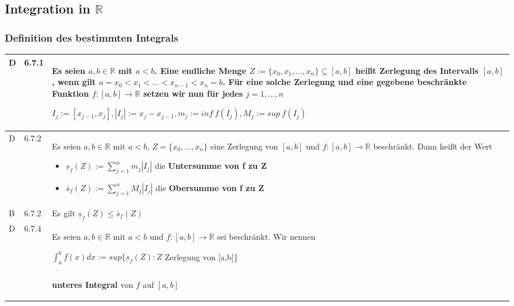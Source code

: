 \pagebreak

\subsection{Integration in $\mathbb{R}$}
\subsubsection{Definition des bestimmten Integrals}

    \begin{longtable}{p{0.75cm} p{1cm} p{16cm}}
        \toprule

        D   & 6.7.1 &   Es seien $a,b \in \mathbb{R}$ mit $a < b$. Eine endliche Menge $Z:= \{ x_0, x_1, \dots, x_n \} \subseteq [a,b]$ heißt
                        \textbf{Zerlegung} des Intervalls $[a,b]$, wenn gilt $a = x_0 < x_1 < \dots < x_{n-1} < x_n = b$. \hfill \break
                        Für eine solche Zerlegung und eine gegebene beschränkte Funktion $f: [a,b] \rightarrow \mathbb{R}$ setzen wir nun
                        für jedes $j = 1,\dots,n$ \hfill \break
                        \centerline{$ I_j := [x_{j-1},x_j], |I_j| := x_j - x_{j-1}, m_j := inf~f(I_j), M_j := sup~f(I_j)$} \\
        \midrule
        D   & 6.7.2 &   Es seien $a,b \in \mathbb{R}$ mit $a < b$, $Z = \{ x_0, \dots, x_n\}$ eine Zerlegung von $[a,b]$ und $f:[a,b]\rightarrow \mathbb{R}$
                        beschränkt. Dann heißt der Wert 
                        \begin{itemize}[topsep=-0.5cm]
                            \item[] $\underline{s}_f(Z) := \sum^{n}_{j=1} m_j |I_j|$ die \textbf{Untersumme von f zu Z}
                            \item[] $\bar{s}_f(Z) := \sum^{n}_{j=1} M_j |I_j|$ die \textbf{Obersumme von f zu Z}
                        \end{itemize} \vspace{-0cm} \\
        \midrule
        B   & 6.7.2 &   Es gilt $\underline{s}_f(Z) \leq \bar{s}_f(Z)$\\
        \midrule
        D   & 6.7.4 &   Es seien $a, b \in \mathbb{R}$ mit $ a < b$ und $f: [a,b] \rightarrow \mathbb{R}$ sei beschränkt. \hfill \break
                        Wir nennen \hfill \break
                        \centerline{$ \underline{\int_a^b} f(x) dx:= sup\{ \underline{s}_f(Z):Z$ Zerlegung von [a,b]\}}
                        \textbf{unteres Integral} von $f$ auf $[a,b]$ \hfill \break

\end{longtable}
